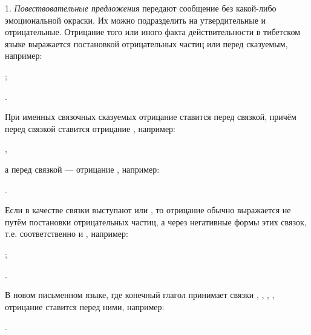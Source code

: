 1. \emph{Повествовательные предложения} передают сообщение без какой-либо эмоциональной окраски. Их можно подразделить на утвердительные и отрицательные. Отрицание того или иного факта действительности в тибетском языке выражается постановкой отрицательных частиц  или  перед сказуемым, например:
\begin{prfsample}
	\item {};
	\item {}.
\end{prfsample}
При именных связочных сказуемых отрицание ставится перед связкой, причём перед связкой  ставится отрицание , например:
\begin{prfsample}
	\item {},
\end{prfsample}
а перед связкой  --- отрицание , например:
\begin{prfsample}
	\item {}.	
\end{prfsample}
Если в качестве связки выступают  или , то отрицание обычно выражается не путём постановки отрицательных частиц, а через негативные формы этих связок, т.е. соответственно  и , например:
\begin{prfsample}
	\item {};
	\item {}.
\end{prfsample}

В новом письменном языке, где конечный глагол принимает связки , , , , отрицание ставится перед ними, например:
\begin{prfsample}
	\item {}.
\end{prfsample}

